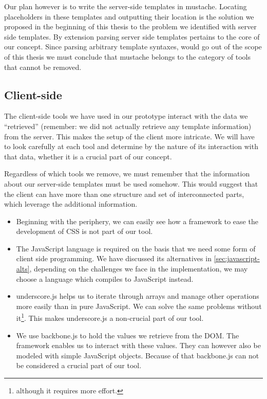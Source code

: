 \documentclass[thesis.tex]{subfiles}
\begin{document}
Our plan however is to write the server-side templates in mustache.
Locating placeholders in these templates and outputting their location
is the solution we proposed in the beginning of this thesis to the problem
we identified with server side templates.
By extension parsing server side templates pertains to the core of our concept.
Since parsing arbitrary template syntaxes, would go out of the scope of this
thesis we must conclude that mustache belongs to the category of tools that
cannot be removed.

\subsection{Client-side}
The client-side tools we have used in our prototype interact with the data we
``retrieved'' (remember: we did not actually retrieve any template information)
from the server. This makes the setup of the client more intricate. We will have
to look carefully at each tool and determine by the nature of its interaction
with that data, whether it is a crucial part of our concept.

Regardless of which tools we remove, we must remember that the information about
our server-side templates must be used somehow. This would suggest that the
client can have more than one structure and set of interconnected parts, which
leverage the additional information.

\begin{itemize}
\item Beginning with the periphery, we can easily see how a framework to ease
the development of CSS is not part of our tool.
\item The JavaScript language is required on the basis that we need some form of
client side programming. We have discussed its alternatives in
\ref{sec:javascript-alts}, depending on the challenges we face in the
implementation, we may choose a language which compiles to JavaScript instead.
\item underscore.js helps us to iterate through arrays and manage other
operations more easily than in pure JavaScript. We can solve the same problems
without it\footnote{
	although it requires more effort.
}. This makes underscore.js a non-crucial part of our tool.
\item We use backbone.js to hold the values we retrieve from the DOM. The
framework enables us to interact with these values. They can however also be
modeled with simple JavaScript objects. Because of that backbone.js can not be
considered a crucial part of our tool.
\end{itemize}
\end{document}
